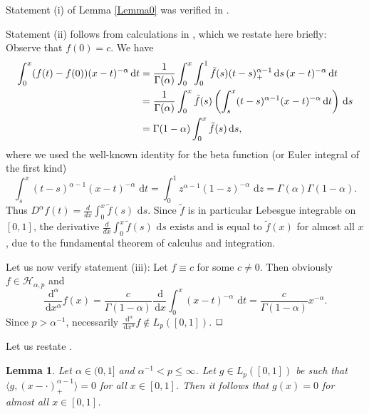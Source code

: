 \documentclass[12pt]{article}
\newtheorem{lemma}{Lemma}
\newenvironment{proof}{\begin{trivlist}
    \item[\hskip\labelsep{\it Proof.}]}{$\hfill\Box$\end{trivlist}}
\newcommand{\rd}{\,\mathrm{d}}
\newcommand{\HH}{\mathcal{H}}
\begin{document}
\begin{proof}
Statement (i) of Lemma \ref{Lemma0} was verified in
\cite[Prop.~1]{D08}.

Statement (ii) follows from calculations in \cite[\S 2.2.1]{D08},
which we restate here briefly:
Observe
that $f(0) = c$.
We have
\begin{equation*}
\begin{split}
\int^x_0 (f(t)-f(0))(x-t)^{-\alpha}\,{\rm d}t
&= \frac{1}{\Gamma(\alpha)} \int^x_0\int^1_0 \tilde{f}(s)
(t-s)^{\alpha -1}_+\,{\rm d}s\, (x-t)^{-\alpha}\,{\rm d}t\\
&= \frac{1}{\Gamma(\alpha)} \int^x_0 \tilde{f}(s)\left( \int^x_s (t-s)^{\alpha-1}
(x-t)^{-\alpha}\,{\rm d}t \right) \,{\rm d}s\\
&= \Gamma(1-\alpha) \int^x_0 \tilde{f}(s)\,{\rm d}s,
\end{split}
\end{equation*}
where we used the well-known identity for the beta function (or Euler integral of the first kind)
\begin{equation}\label{beta-integral}
\int^x_s (t-s)^{\alpha-1} (x-t)^{-\alpha}\,\rd t
=\int^1_0 z^{\alpha-1}(1-z)^{-\alpha}\, \rd z
= \Gamma(\alpha)\Gamma(1-\alpha).
\end{equation}
Thus $D^\alpha f(t) = \frac{d}{dx} \int^x_0 \tilde{f}(s)\,\rd s$.
Since $\tilde{f}$ is in particular Lebesgue integrable on $[0,1]$,
the derivative $\frac{d}{dx} \int^x_0 \tilde{f}(s)\,\rd s$ exists
and is equal to $\tilde{f}(x)$ for almost all $x$, due to the fundamental
theorem of calculus and integration.

Let us now verify statement (iii): Let $f\equiv c$ for some $c\neq 0$. Then obviously $f\in \HH_{\alpha,p}$ and
\begin{equation*}
\frac{\rd^{\alpha}}{\rd x^\alpha} f(x) =
\frac{c}{\Gamma(1-\alpha)} \frac{\rd}{\rd x} \int^x_0 (x-t)^{-\alpha}
\,\rd t = \frac{c}{\Gamma(1-\alpha)} x^{-\alpha}.
\end{equation*}
Since $p>\alpha^{-1}$, necessarily
$\frac{\rd^{\alpha}}{\rd x^\alpha}f\notin L_p([0,1])$.
\end{proof}


Let us restate \cite[Lemma 1]{D08}.


\begin{lemma}\label{Note}
Let $\alpha \in (0, 1]$ and $\alpha^{-1} < p \le \infty$. Let
$g \in L_p([0,1])$ be
such that $\langle g, (x-\cdot)_+^{\alpha-1} \rangle = 0$
for all $x \in [0,1]$. Then it follows that $g(x) =0$ for almost all
$x \in [0,1]$.
\end{lemma}
\end{document}
